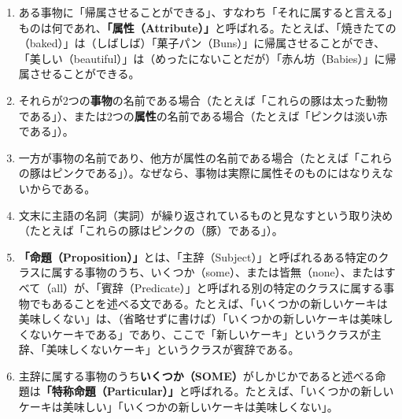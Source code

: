 \documentclass[a4paper,11pt,openany]{ltjsbook}
\begin{document}
\begin{enumerate}[label=\textbf{\arabic*.}]
\item ある事物に「帰属させることができる」、すなわち「それに属すると言える」ものは何であれ、\textbf{「属性（Attribute）」}と呼ばれる。たとえば、「焼きたての（baked）」は（しばしば）「菓子パン（Buns）」に帰属させることができ、「美しい（beautiful）」は（めったにないことだが）「赤ん坊（Babies）」に帰属させることができる。
\item それらが2つの\textbf{事物}の名前である場合（たとえば「これらの豚は太った動物である」）、または2つの\textbf{属性}の名前である場合（たとえば「ピンクは淡い赤である」）。
\item 一方が事物の名前であり、他方が属性の名前である場合（たとえば「これらの豚はピンクである」）。なぜなら、事物は実際に属性そのものにはなりえないからである。
\item 文末に主語の名詞（実詞）が繰り返されているものと見なすという取り決め（たとえば「これらの豚はピンクの（豚）である」）。
\item \textbf{「命題（Proposition）」}とは、「主辞（Subject）」と呼ばれるある特定のクラスに属する事物のうち、いくつか（some）、または皆無（none）、またはすべて（all）が、「賓辞（Predicate）」と呼ばれる別の特定のクラスに属する事物でもあることを述べる文である。たとえば、「いくつかの新しいケーキは美味しくない」は、（省略せずに書けば）「いくつかの新しいケーキは美味しくないケーキである」であり、ここで「新しいケーキ」というクラスが主辞、「美味しくないケーキ」というクラスが賓辞である。
\item 主辞に属する事物のうち\textbf{いくつか（SOME）}がしかじかであると述べる命題は\textbf{「特称命題（Particular）」}と呼ばれる。たとえば、「いくつかの新しいケーキは美味しい」「いくつかの新しいケーキは美味しくない」。


\end{enumerate}
\end{document}
